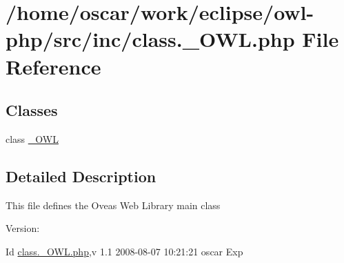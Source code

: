 \hypertarget{class_8__OWL_8php}{
\section{/home/oscar/work/eclipse/owl-php/src/inc/class.\_\-OWL.php File Reference}
\label{class_8__OWL_8php}
}
\subsection*{Classes}
\begin{CompactItemize}
\item 
class \hyperlink{class__OWL}{\_\-OWL}
\end{CompactItemize}


\subsection{Detailed Description}
This file defines the Oveas Web Library main class \begin{Desc}
\item[Version:]\end{Desc}
\begin{Desc}
\item[Id]\hyperlink{class_8__OWL_8php}{class.\_\-OWL.php},v 1.1 2008-08-07 10:21:21 oscar Exp \end{Desc}
